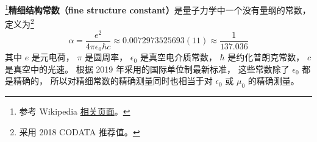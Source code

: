 

\footnote{参考 Wikipedia \href{https://en.wikipedia.org/wiki/Fine-structure_constant}{相关页面}。}\textbf{精细结构常数（fine structure constant）}是量子力学中一个没有量纲的常数， 定义为\footnote{采用 2018 CODATA 推荐值。}
\begin{equation}\label{FinStr_eq1}
\alpha = \frac{e^2}{4\pi\epsilon_0\hbar c} \approx 0.0072973525693(11) \approx \frac{1}{137.036}
\end{equation}
其中 $e$ 是元电荷， $\pi$ 是圆周率， $\epsilon_0$ 是真空电介质常数， $\hbar$ 是约化普朗克常数， $c$ 是真空中的光速。 %
根据 2019 年采用的国际单位制最新标准， 这些常数除了 $\epsilon_0$ 都是精确的， 所以对精细常数的精确测量同时也相当于对 $\epsilon_0$ 或 $\mu_0$ 的精确测量。
